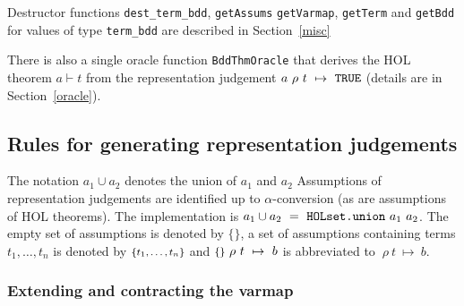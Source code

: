 \documentclass[12pt]{article}
\newlength{\minipagewidth}
\renewcommand{\t}[1]{\mbox{\tt #1}}
\newcommand{\ml}[1]{{\tt #1}}
\newcommand{\termbdd}[4]{\mbox{$#1~#2~#3~\mapsto~#4$}}
\newcommand{\emptyass}{\mbox{\footnotesize$\{\xspace\}$}\xspace}
\newcommand{\setass}[1]{\mbox{\footnotesize$\{#1\}$}\xspace}
\newcommand\termbddty{\texttt{term\_bdd}\xspace}
\begin{document}
Destructor functions \t{dest\_term\_bdd}, \t{getAssums} \t{getVarmap}, \t{getTerm}
and \t{getBdd} for values of type \termbddty are described in Section~\ref{misc}

There is also a single oracle function
\t{BddThmOracle} that derives the HOL theorem $a \vdash t$
from the representation judgement \termbdd{a}{\rho}{t}{\ml{TRUE}}
(details are in Section~\ref{oracle}).

\subsection{Rules for generating representation judgements}\label{term-bdd-rules}

The notation $a_1 \cup a_2$ denotes the union of $a_1$ and $a_2$ 
Assumptions of
representation judgements are identified up to $\alpha$-conversion (as
are assumptions of HOL theorems).
The implementation is $a_1 \cup a_2~=~\t{HOLset.union}~a_1~a_2$. 
The empty set of assumptions is denoted by \emptyass, a set of
assumptions containing terms $t_1, \ldots ,t_n$ is denoted by
$\setass{t_1, \ldots ,t_n}$  and 
$\termbdd{\emptyass}{\rho}{t}{b}$ is abbreviated to
$\termbdd{}{\rho}{t}{b}$.


\subsubsection*{Extending and contracting the varmap}

\newsavebox\BddExtendVarmap
{}
\fbox{\usebox{\BddExtendVarmap}}
\end{document}
